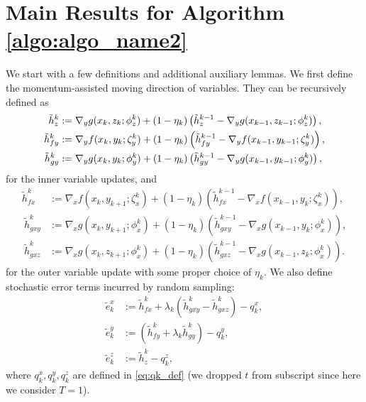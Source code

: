 

\section{Main Results for Algorithm \ref{algo:algo_name2}}
\label{appendix:momentum_method}
We start with a few definitions and additional auxiliary lemmas. We first define the momentum-assisted moving direction of variables. They can be recursively defined as
\begin{align*}
    \tilde{h}_{z}^{k} &:= \nabla_y g(x_k, z_{k}; \phi_{z}^{k}) + (1 - \eta_{k}) \left( \tilde{h}_{z}^{k-1} - \nabla_y g(x_{k-1}, z_{k-1}; \phi_{z}^{k}) \right), \\
    \tilde{h}_{fy}^{k} &:= \nabla_y f(x_k, y_{k}; \zeta_{y}^{k}) + (1 - \eta_{k}) \left( \tilde{h}_{fy}^{k-1} - \nabla_y f(x_{k-1}, y_{k-1}; \zeta_{y}^{k}) \right), \\
    \tilde{h}_{gy}^{k} &:= \nabla_y g (x_k, y_{k}; \phi_{y}^{k}) + (1 - \eta_{k}) \left( \tilde{h}_{gy}^{k-1} - \nabla_y g (x_{k-1}, y_{k-1}; \phi_{y}^{k}) \right), 
\end{align*}
for the inner variable updates, and 
\begin{align*}
    \tilde{h}_{fx}^k &:= \nabla_x f(x_k, y_{k+1}; \zeta_{x}^k) + (1 - \eta_k) \left(\tilde{h}_{fx}^{k-1} - \nabla_x f(x_{k-1}, y_{k}; \zeta_{x}^k) \right), \\
    \ \tilde{h}_{gxy}^k &:= \nabla_{x} g(x_k, y_{k+1}; \phi_{x}^k) + (1 - \eta_k) \left(\tilde{h}_{gxy}^{k-1} - \nabla_x g(x_{k-1}, y_{k}; \phi_{x}^k) \right), \\ 
    \ \tilde{h}_{gxz}^k &:= \nabla_{x} g(x_k, z_{k+1}; \phi_{x}^k) + (1 - \eta_k) \left(\tilde{h}_{gxz}^{k-1} - \nabla_x g(x_{k-1}, z_{k}; \phi_{x}^k) \right).
\end{align*}
for the outer variable update with some proper choice of $\eta_k$. We also define stochastic error terms incurred by random sampling:
\begin{align}
    \tilde{e}_k^x &:= \tilde{h}_{fx}^k + \lambda_k (\tilde{h}_{gxy}^k - \tilde{h}_{gxz}^k) - q_k^x, \nonumber \\
    \tilde{e}_k^y &:= (\tilde{h}_{fy}^k + \lambda_k \tilde{h}_{gy}^k) - q_k^y, \nonumber \\
    \tilde{e}_k^z &:= \tilde{h}_{z}^k - q_k^z, \label{eq:def_ek}
\end{align}
where $q_k^x, q_k^y, q_k^z$ are 
defined in \eqref{eq:qk_def} (we dropped $t$ from subscript since here we consider $T=1$). 


